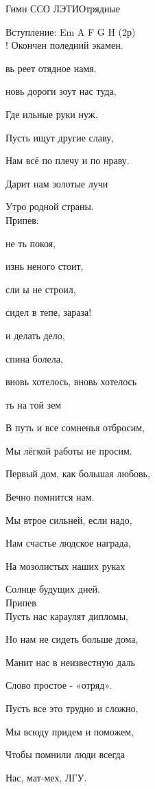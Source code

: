 \documentclass[11pt,a5paper]{book}
\renewcommand{\tt}{\indent \indent}
\begin{document}
\begin{song}{Гимн ССО ЛЭТИ}{}{}{Отрядные}{}{}

Вступление: Em A F G H (2р)\\

! Окончен поледний экамен.\par
{}вь реет отядное намя.\par
{}новь дороги зоут нас туда,\par
Где ильные руки нуж.\par
Пусть ищут другие славу,\par
Нам всё по плечу и по нраву.\par
Дарит нам золотые лучи \par
Утро родной страны.\\

Припев: \par
\tt{} не ть покоя,\par
\tt{}изнь неного стоит,\par
\tt{}сли ы не строил,\par
\tt{}сидел в тепе, зараза!\par
{} и делать дело,\par
{} спина болела,\par
{} вновь хотелось, вновь хотелось\par
\tt{}ть на той зем\\

\newpage

В путь и все сомненья отбросим,\par
Мы лёгкой работы не просим.\par
Первый дом, как большая любовь,\par
Вечно помнится нам.\par
Мы втрое сильней, если надо,\par
Нам счастье людское награда,\par
На мозолистых наших руках\par
Солнце будущих дней.\\

Припев\\

Пусть нас караулят дипломы,\par
Но нам не сидеть больше дома,\par
Манит нас в неизвестную даль\par
Слово простое - «отряд».\par
Пусть все это трудно и сложно,\par
Мы всюду придем и поможем,\par
Чтобы помнили люди всегда\par
Нас, мат-мех, ЛГУ.\\


\end{song}
\end{document}
